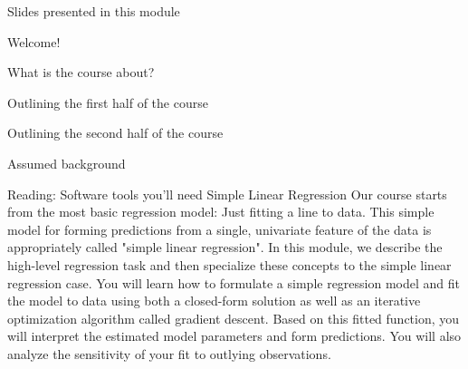 \item Slides presented in this module
\item Welcome!
\item What is the course about?
\item Outlining the first half of the course
\item Outlining the second half of the course
\item Assumed background
\item Reading: Software tools you'll need
Simple Linear Regression
Our course starts from the most basic regression model: Just fitting a line to data. This simple model for forming predictions from a single, univariate feature of the data is appropriately called "simple linear regression".
In this module, we describe the high-level regression task and then specialize these concepts to the simple linear regression case. You will learn how to formulate a simple regression model and fit the model to data using both a closed-form solution as well as an iterative optimization algorithm called gradient descent. Based on this fitted function, you will interpret the estimated model parameters and form predictions. You will also analyze the sensitivity of your fit to outlying observations.

